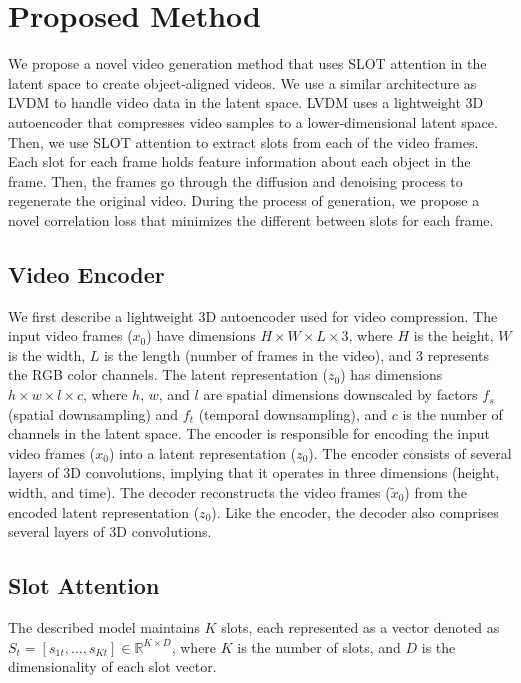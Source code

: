 \section{Proposed Method}

We propose a novel video generation method that uses SLOT attention in the latent space to create object-aligned videos. 
We use a similar architecture as LVDM to handle video data in the latent space. 
LVDM uses a lightweight 3D autoencoder that compresses video samples to a lower-dimensional latent space. Then, we use SLOT attention to extract slots from each of the video frames. 
Each slot for each frame holds feature information about each object in the frame. 
Then, the frames go through the diffusion and denoising process to regenerate the original video. 
During the process of generation, we propose a novel correlation loss that minimizes the different between slots for each frame.

\subsection{Video Encoder}
We first describe a lightweight 3D autoencoder used for video compression. 
The input video frames (\(x_0\)) have dimensions \(H \times W \times L \times 3\), where \(H\) is the height, \(W\) is the width, \(L\) is the length (number of frames in the video), and 3 represents the RGB color channels.
The latent representation (\(z_0\)) has dimensions \(h \times w \times l \times c\), where \(h\), \(w\), and \(l\) are spatial dimensions downscaled by factors \(f_s\) (spatial downsampling) and \(f_t\) (temporal downsampling), and \(c\) is the number of channels in the latent space. 
The encoder is responsible for encoding the input video frames (\(x_0\)) into a latent representation (\(z_0\)). The encoder consists of several layers of 3D convolutions, implying that it operates in three dimensions (height, width, and time). 
The decoder reconstructs the video frames (\(\widetilde{x}_0\)) from the encoded latent representation (\(z_0\)). 
Like the encoder, the decoder also comprises several layers of 3D convolutions.

\subsection{Slot Attention}
The described model maintains \(K\) slots, each represented as a vector denoted as \(S_t = [s_{1t}, \ldots, s_{Kt}] \in \mathbb{R}^{K \times D}\), where \(K\) is the number of slots, and \(D\) is the dimensionality of each slot vector.